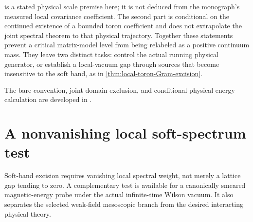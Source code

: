 \documentclass[11pt,oneside,openany]{book}
\theoremstyle{definition}
\theoremstyle{remark}
\newcommand{\src}[2]{\cite[#2]{#1}}
\newcommand{\sourcebasis}[1]{\par\smallskip\noindent #1\par}
\begin{document}
 is a stated physical
scale premise here; it is not deduced from the monograph's measured
local covariance coefficient. The second part is conditional on the
continued existence of a bounded toron coefficient and does not
extrapolate the joint spectral theorem to that physical trajectory.
Together these statements prevent a critical matrix-model level from
being relabeled as a positive continuum mass. They leave two distinct
tasks: control the actual running physical generator, or establish a
local-vacuum gap through sources that become insensitive to the soft
band, as in \cref{thm:local-toron-Gram-excision}.
\sourcebasis{The bare convention, joint-domain exclusion, and
conditional physical-energy calculation are developed in
\src{F16B}{V55}.}


\section{A nonvanishing local soft-spectrum test}
\label{sec:smeared-vacuum-probe}
Soft-band excision requires vanishing local spectral weight, not
merely a lattice gap tending to zero. A complementary test is
available for a canonically smeared magnetic-energy probe under the
actual infinite-time Wilson vacuum. It also separates the selected
weak-field mesoscopic branch from the desired interacting physical
theory.
\end{document}
